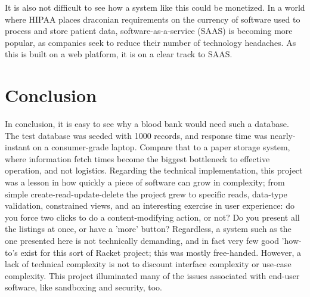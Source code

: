 \documentclass[runningheads,a4paper]{llncs}
\begin{document}
It is also not difficult to see how a system like this could be monetized. In a world where HIPAA places draconian requirements on the currency of software used to process and store patient data, software-as-a-service (SAAS) is becoming more popular, as companies seek to reduce their number of technology headaches. As this is built on a web platform, it is on a clear track to SAAS.
\section{Conclusion}\label{sec:conc}
In conclusion, it is easy to see why a blood bank would need such a database. The test database was seeded with 1000 records, and response time was nearly-instant on a consumer-grade laptop. Compare that to a paper storage system, where information fetch times become the biggest bottleneck to effective operation, and not logistics. Regarding the technical implementation, this project was a lesson in how quickly a piece of software can grow in complexity; from simple create-read-update-delete the project grew to specific reads, data-type validation, constrained views, and an interesting exercise in user experience: do you force two clicks to do a content-modifying action, or not? Do you present all the listings at once, or have a 'more' button? Regardless, a system such as the one presented here is not technically demanding, and in fact very few good 'how-to's exist for this sort of Racket project; this was mostly free-handed. However, a lack of technical complexity is not to discount interface complexity or use-case complexity. This project illuminated many of the issues associated with end-user software, like sandboxing and security, too.



\end{document}
